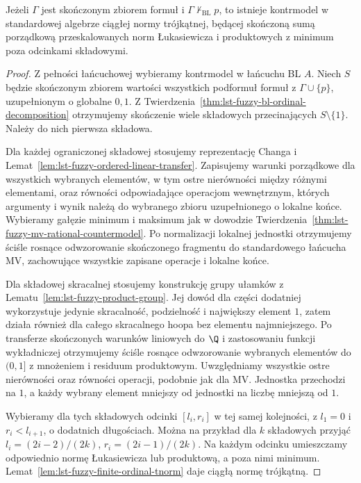 \begin{twierdzenie}
\label{thm:lst-fuzzy-bl-finite-countermodel}
Jeżeli $\Gamma$ jest skończonym zbiorem formuł i
$\Gamma\nvdash_{\mathrm{BL}}p$, to istnieje kontrmodel
w standardowej algebrze ciągłej normy trójkątnej,
będącej skończoną sumą porządkową przeskalowanych
norm Łukasiewicza i produktowych z minimum poza
odcinkami składowymi.
\end{twierdzenie}
\begin{proof}
Z pełności łańcuchowej wybieramy kontrmodel w łańcuchu
BL $A$. Niech $S$ będzie skończonym zbiorem wartości
wszystkich podformuł formuł z $\Gamma\cup\{p\}$,
uzupełnionym o globalne $0,1$. Z
Twierdzenia~\ref{thm:lst-fuzzy-bl-ordinal-decomposition}
otrzymujemy skończenie wiele składowych przecinających
$S\setminus\{1\}$. Należy do nich pierwsza składowa.

Dla każdej ograniczonej składowej stosujemy
reprezentację Changa i
Lemat~\ref{lem:lst-fuzzy-ordered-linear-transfer}.
Zapisujemy warunki porządkowe dla wszystkich
wybranych elementów, w tym ostre nierówności
między różnymi elementami, oraz równości
odpowiadające operacjom wewnętrznym, których
argumenty i wynik należą do wybranego zbioru
uzupełnionego o lokalne końce.
Wybieramy gałęzie minimum i maksimum jak w dowodzie
Twierdzenia~\ref{thm:lst-fuzzy-mv-rational-countermodel}.
Po normalizacji lokalnej jednostki otrzymujemy
ściśle rosnące odwzorowanie skończonego fragmentu
do standardowego łańcucha MV, zachowujące
wszystkie zapisane operacje i lokalne końce.

Dla składowej skracalnej stosujemy konstrukcję
grupy ułamków z
Lematu~\ref{lem:lst-fuzzy-product-group}.
Jej dowód dla części dodatniej wykorzystuje jedynie
skracalność, podzielność i największy element $1$,
zatem działa również dla całego skracalnego hoopa
bez elementu najmniejszego. Po transferze skończonych
warunków liniowych do $\Q$ i zastosowaniu
funkcji wykładniczej otrzymujemy ściśle rosnące
odwzorowanie wybranych elementów do $(0,1]$
z mnożeniem i residuum produktowym. Uwzględniamy
wszystkie ostre nierówności oraz równości
operacji, podobnie jak dla MV.
Jednostka przechodzi na $1$, a każdy wybrany
element mniejszy od jednostki na liczbę mniejszą
od $1$.

Wybieramy dla tych składowych odcinki $[l_i,r_i]$
w tej samej kolejności, z $l_1=0$ i
$r_i<l_{i+1}$, o dodatnich długościach.
Można na przykład dla $k$ składowych przyjąć
$l_i=(2i-2)/(2k)$, $r_i=(2i-1)/(2k)$.
Na każdym odcinku umieszczamy odpowiednio normę
Łukasiewicza lub produktową, a poza nimi minimum.
Lemat~\ref{lem:lst-fuzzy-finite-ordinal-tnorm}
daje ciągłą normę trójkątną.


\end{proof}
